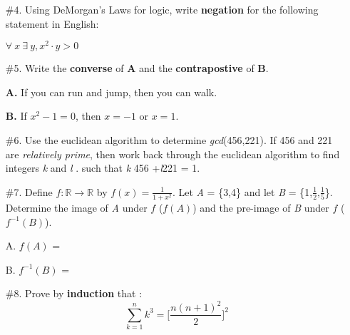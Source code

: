 \documentclass[10pt,letterpaper]{article}
\begin{document}
\newpage{}
{

\begin{enumerate}
	\item[\#4.] Using DeMorgan's Laws for logic, write \textbf{negation} for the following statement in English:
	\begin{center}
	    $\forall \: x \: \exists \: y, x^{2} \cdot y > 0 $
	\end{center}
\vspace{4em}

\item[\#5.] Write the \textbf{converse} of \textbf{A} and the \textbf{contrapostive} of \textbf{B}.

\textbf{A.} If you can run and jump, then you can walk.
\vspace{3em}

\textbf{B.} If $x^{2} - 1 = 0$, then $x = -1 \text{ or } x = 1.$
\vspace{3em}

\item[\#6.] Use the euclidean algorithm to determine \textit{gcd}(456,221). If 456 and 221 are \textit{relatively prime}, then work back through the euclidean algorithm to find integers \textit{k} and \textit{l} . such that \textit{k} 456 +\textit{l}221 = 1.
\vspace{4em}

\item[\#7.] Define $ f : \mathbb{R} \rightarrow{\mathbb{R}}$ by $f(x) = \frac{1}{1+x^{2}}$. Let \textit{A} = \{3,4\} and let \textit{B} = \{1,$\frac{1}{2}$,$\frac{1}{5}$\}. Determine the image of \textit{A} under $f$ ($f(\textit{A})$) and the pre-image of \textit{B} under $f$ ($f^{-1}(\textit{B})$).
\vspace{2em}

A. $f(\textit{A})$ =
\vspace{1em}

B. $f^{-1}(\textit{B})$ = 
\vspace{4em}

\item[\#8.] Prove by \textbf{induction} that : $$\sum_{k =1}^{n} k^{3} = \Big[ \frac{n(n+1)^{2}}{2} \Big] ^{2}$$



\end{enumerate}
}
\end{document}
